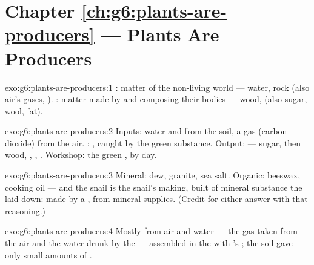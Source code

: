 \section*{Chapter \ref{ch:g6:plants-are-producers} --- Plants Are Producers}

\begin{solution}{exo:g6:plants-are-producers:1}
: matter of the non-living world --- water,
rock (also air's gases, ). :
matter made by  and composing their bodies ---
wood,  (also sugar, wool, fat).
\end{solution}

\begin{solution}{exo:g6:plants-are-producers:2}
Inputs: water and  from the soil, a gas (carbon
dioxide) from the air. : , caught by the green
substance. Output:  --- sugar, then wood, ,
, . Workshop: the green , by day.
\end{solution}

\begin{solution}{exo:g6:plants-are-producers:3}
Mineral: dew, granite, sea salt. Organic: beeswax, cooking
oil --- and the snail  is the snail's making, built of
mineral substance the  laid down: made by a , from mineral supplies. (Credit for either answer with
that reasoning.)
\end{solution}

\begin{solution}{exo:g6:plants-are-producers:4}
Mostly from air and water --- the gas taken from the air and
the water drunk by the  --- assembled in the  with
's ; the soil gave only small amounts of .
\end{solution}

